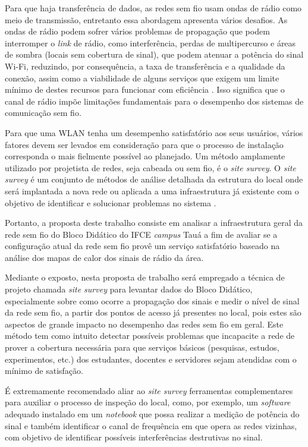 Para que haja transferência de dados, as redes sem fio usam ondas de rádio como meio de transmissão, entretanto essa abordagem apresenta vários desafios. As ondas de rádio podem sofrer vários problemas de propagação que podem interromper o \textit{link} de rádio, como interferência, perdas de multipercurso e áreas de sombra (locais sem cobertura de sinal), que podem atenuar a potência do sinal Wi-Fi, reduzindo, por consequência, a taxa de transferência e a qualidade da conexão, assim como a viabilidade de alguns serviços que exigem um limite mínimo de destes recursos para funcionar com eficiência
 \cite{gast2002}. Isso significa que o canal de rádio impõe limitações fundamentais para o desempenho dos sistemas de comunicação sem fio.

Para que uma WLAN tenha um desempenho satisfatório aos seus usuários, vários fatores devem ser levados em consideração para que o processo de instalação corresponda o mais fielmente possível ao planejado. Um método amplamente utilizado por projetista de redes, seja cabeada ou sem fio, é o \textit{site survey}. O \textit{site survey} é um conjunto de métodos de análise detalhada da estrutura do local onde será implantada a nova rede ou aplicada a uma infraestrutura já existente com o objetivo de identificar e solucionar problemas no sistema \cite{pinheiro2004site}.

Portanto, a proposta deste trabalho consiste em analisar a infraestrutura geral da rede sem fio do Bloco Didático do IFCE \textit{campus} Tauá a fim de avaliar se a configuração atual da rede sem fio provê um serviço satisfatório baseado na análise dos mapas de calor dos sinais de rádio da área.

Mediante o exposto, nesta proposta de trabalho será empregado a técnica de projeto chamada \textit{site survey} para levantar dados do Bloco Didático, especialmente sobre como ocorre a propagação dos sinais e medir o nível de sinal da rede sem fio, a partir dos pontos de acesso já presentes no local, pois estes são aspectos de grande impacto no desempenho das redes sem fio em geral.  Este método tem como intuito detectar possíveis problemas que incapacite a rede de prover a cobertura necessária para que serviços básicos (pesquisas, estudos, experimentos, etc.) dos estudantes, docentes e servidores sejam atendidas com o mínimo de satisfação.

É extremamente recomendado aliar ao \textit{site survey} ferramentas complementares para auxiliar o processo de inspeção do local, como, por exemplo, um \textit{software} adequado instalado em um \textit{notebook} que possa realizar a medição de potência do sinal e também identificar o canal de frequência em que opera as redes vizinhas, com objetivo de identificar possíveis interferências destrutivas no sinal.

